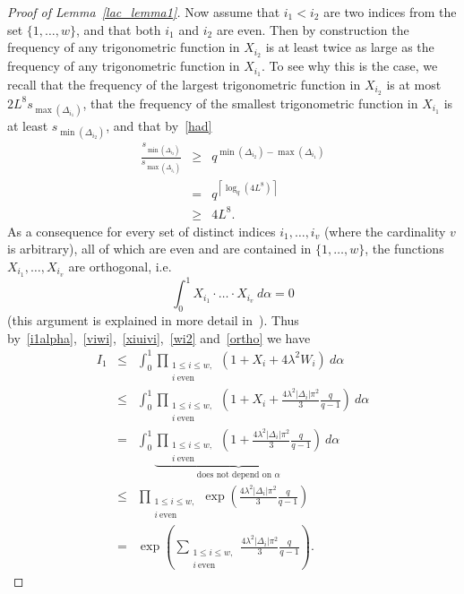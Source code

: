 \documentclass[12pt]{amsart}
\begin{document}
\begin{proof}[Proof of Lemma~\ref{lac_lemma1}]
Now assume that $i_1 < i_2$ are two indices from the set $\{1, \dots, w\}$, and that both $i_1$ and $i_2$ are even. Then by construction the frequency of any trigonometric function in $X_{i_2}$ is at least twice as large as the frequency of any trigonometric function in $X_{i_1}$. To see why this is the case, we recall that the frequency of the largest trigonometric function in $X_{i_2}$ is at most $2 L^8 s_{\max(\Delta_{i_1})}$, that the frequency of the smallest trigonometric function in $X_{i_1}$ is at least $s_{\min(\Delta_{i_2})}$, and that by~\eqref{had}
\begin{eqnarray*}
\frac{s_{\min(\Delta_{i_2})}}{s_{\max(\Delta_{i_1})}} & \geq & q^{\min(\Delta_{i_2}) - \max(\Delta_{i_1})} \\
& = & q^{\left\lceil \log_q (4 L^8) \right\rceil}\\
& \geq & 4 L^8.
\end{eqnarray*}
As a consequence for every set of distinct indices $i_{1}, \dots, i_v$ (where the cardinality $v$ is arbitrary), all of which are even and are contained in $\{1, \dots, w\}$, the functions $X_{i_1}, \dots, X_{i_v}$ are orthogonal, i.e.
\begin{equation} \label{ortho}
\int_0^1 X_{i_1} \cdot \dots \cdot X_{i_v} ~d\alpha = 0
\end{equation}
(this argument is explained in more detail in~\cite{philipp,taka}). Thus by~\eqref{i1alpha},~\eqref{viwi},~\eqref{xiuivi},~\eqref{wi2} and~\eqref{ortho} we have
\begin{eqnarray*}
I_1 & \leq & \int_0^1 \prod_{\substack{1 \leq i \leq w,\\ i ~\textrm{even}}} \left( 1 + X_i + 4 \lambda^2 W_i \right)~d\alpha \\
& \leq & \int_0^1 \prod_{\substack{1 \leq i \leq w,\\ i ~\textrm{even}}} \left(1 + X_i + \frac{4 \lambda^2 |\Delta_i| \pi^2}{3} \frac{q}{q-1}\right) ~d\alpha \\
& = & \int_0^1 \underbrace{\prod_{\substack{1 \leq i \leq w,\\ i ~\textrm{even}}} \left(1 + \frac{4 \lambda^2 |\Delta_i| \pi^2}{3} \frac{q}{q-1}\right)}_{\textrm{does not depend on $\alpha$}} ~d\alpha \\
& \leq & \prod_{\substack{1 \leq i \leq w,\\ i ~\textrm{even}}} \exp \left(\frac{4 \lambda^2 |\Delta_i| \pi^2}{3} \frac{q}{q-1}\right)\\
& = & \exp \left( \sum_{\substack{1 \leq i \leq w,\\ i ~\textrm{even}}} \frac{4 \lambda^2 |\Delta_i| \pi^2}{3} \frac{q}{q-1}\right).

\end{eqnarray*}
\end{proof}
\end{document}
